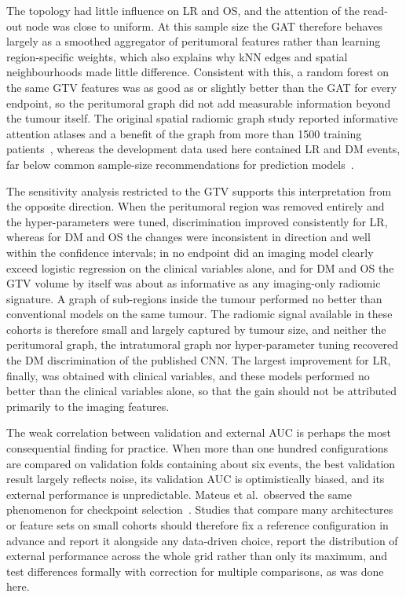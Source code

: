 \documentclass[11pt,a4paper]{article}
\begin{document}
The topology had little influence on LR and OS, and the attention of the read-out node was close to uniform. At this sample size the GAT therefore behaves largely as a smoothed aggregator of peritumoral features rather than learning region-specific weights, which also explains why kNN edges and spatial neighbourhoods made little difference. Consistent with this, a random forest on the same GTV features was as good as or slightly better than the GAT for every endpoint, so the peritumoral graph did not add measurable information beyond the tumour itself. The original spatial radiomic graph study reported informative attention atlases and a benefit of the graph from more than 1500 training patients~\cite{bae2025spatial}, whereas the development data used here contained \eLRHNPET{} LR and \eDMHNPET{} DM events, far below common sample-size recommendations for prediction models~\cite{riley2020samplesize}.

The sensitivity analysis restricted to the GTV supports this interpretation from the opposite direction. When the peritumoral region was removed entirely and the hyper-parameters were tuned, discrimination improved consistently for LR, whereas for DM and OS the changes were inconsistent in direction and well within the confidence intervals; in no endpoint did an imaging model clearly exceed logistic regression on the clinical variables alone, and for DM and OS the GTV volume by itself was about as informative as any imaging-only radiomic signature. A graph of sub-regions inside the tumour performed no better than conventional models on the same tumour. The radiomic signal available in these cohorts is therefore small and largely captured by tumour size, and neither the peritumoral graph, the intratumoral graph nor hyper-parameter tuning recovered the DM discrimination of the published CNN. The largest improvement for LR, finally, was obtained with clinical variables, and these models performed no better than the clinical variables alone, so that the gain should not be attributed primarily to the imaging features.

The weak correlation between validation and external AUC is perhaps the most consequential finding for practice. When more than one hundred configurations are compared on validation folds containing about six events, the best validation result largely reflects noise, its validation AUC is optimistically biased, and its external performance is unpredictable. Mateus et al.\ observed the same phenomenon for checkpoint selection~\cite{mateus2023}. Studies that compare many architectures or feature sets on small cohorts should therefore fix a reference configuration in advance and report it alongside any data-driven choice, report the distribution of external performance across the whole grid rather than only its maximum, and test differences formally with correction for multiple comparisons, as was done here.
\end{document}
